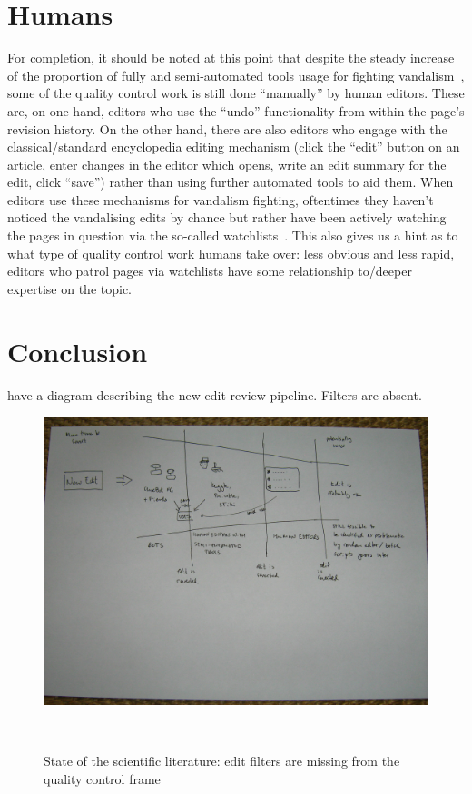 
\section{Humans}

For completion, it should be noted at this point that despite the steady increase of the proportion of fully and semi-automated tools usage for fighting vandalism~\cite{Geiger2009}, some of the quality control work is still done ``manually'' by human editors.
These are, on one hand, editors who use the ``undo'' functionality from within the page's revision history.
On the other hand, there are also editors who engage with the classical/standard encyclopedia editing mechanism (click the ``edit'' button on an article, enter changes in the editor which opens, write an edit summary for the edit, click ``save'') rather than using further automated tools to aid them.
When editors use these mechanisms for vandalism fighting, oftentimes they haven't noticed the vandalising edits by chance but rather have been actively watching the pages in question via the so-called watchlists~\cite{AstHal2018}.
This also gives us a hint as to what type of quality control work humans take over: less obvious and less rapid, editors who patrol pages via watchlists have some relationship to/deeper expertise on the topic. %

\section{Conclusion}
\cite{AstHal2018} have a diagram describing the new edit review pipeline. Filters are absent.

\begin{figure}
\centering
  \includegraphics[width=0.9\columnwidth]{pics/funnel-diagramm-no-filters.JPG}
  \caption{State of the scientific literature: edit filters are missing from the quality control frame}~\label{fig:funnel-no-filters}
\end{figure}


